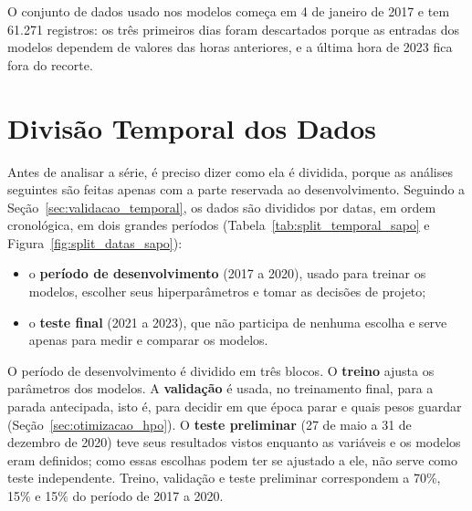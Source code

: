 O conjunto de dados usado nos modelos começa em 4 de janeiro de 2017 e tem 61.271 registros: os três primeiros dias foram descartados porque as entradas dos modelos dependem de valores das horas anteriores, e a última hora de 2023 fica fora do recorte.

\section{Divisão Temporal dos Dados}
\label{sec:divisao_temporal}

Antes de analisar a série, é preciso dizer como ela é dividida, porque as análises seguintes são feitas apenas com a parte reservada ao desenvolvimento. Seguindo a Seção~\ref{sec:validacao_temporal}, os dados são divididos por datas, em ordem cronológica, em dois grandes períodos (Tabela~\ref{tab:split_temporal_sapo} e Figura~\ref{fig:split_datas_sapo}):

\begin{itemize}
    \item o \textbf{período de desenvolvimento} (2017 a 2020), usado para treinar os modelos, escolher seus hiperparâmetros e tomar as decisões de projeto;
    \item o \textbf{teste final} (2021 a 2023), que não participa de nenhuma escolha e serve apenas para medir e comparar os modelos.
\end{itemize}

O período de desenvolvimento é dividido em três blocos. O \textbf{treino} ajusta os parâmetros dos modelos. A \textbf{validação} é usada, no treinamento final, para a parada antecipada, isto é, para decidir em que época parar e quais pesos guardar (Seção~\ref{sec:otimizacao_hpo}). O \textbf{teste preliminar} (27 de maio a 31 de dezembro de 2020) teve seus resultados vistos enquanto as variáveis e os modelos eram definidos; como essas escolhas podem ter se ajustado a ele, não serve como teste independente. Treino, validação e teste preliminar correspondem a 70\%, 15\% e 15\% do período de 2017 a 2020.

\begin{table}[htbp]
    \centering
    \caption{Divisão cronológica dos dados da estação Sapo.}
    \label{tab:split_temporal_sapo}
    \small
\end{table}

